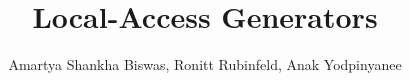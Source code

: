 \documentclass[final]{beamer}
\title{Local-Access Generators} %
\author{Amartya Shankha Biswas, Ronitt Rubinfeld, Anak Yodpinyanee} %
\institute{CSAIL, MIT} %
\newlength{\sepwid}
\newlength{\leftsepwid}
\newlength{\leftcolwid}
\newlength{\rightcolwid}
\newlength{\twocolwid}
\begin{document}

\setlength{\belowcaptionskip}{2ex} %
\setlength\belowdisplayshortskip{2ex} %

\begin{frame}[t] %


\begin{columns}[t] %

\begin{column}{\leftsepwid}\end{column} %

\begin{column}{\leftcolwid} %




\end{column} %


\begin{column}{\sepwid}\end{column} %


\begin{column}{\twocolwid} %






\end{column} %



\begin{column}{\sepwid}\end{column} %



\begin{column}{\rightcolwid} %


\end{column}
\end{columns}
\end{frame}
\end{document}
